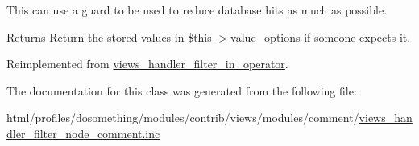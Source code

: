 This can use a guard to be used to reduce database hits as much as possible.

\begin{DoxyReturn}{Returns}
Return the stored values in \$this-\/$>$value\_\-options if someone expects it. 
\end{DoxyReturn}


Reimplemented from \hyperlink{classviews__handler__filter__in__operator_aa5b5df6d90f4359ed28c0c446bdc81a6}{views\_\-handler\_\-filter\_\-in\_\-operator}.

The documentation for this class was generated from the following file:\begin{DoxyCompactItemize}
\item 
html/profiles/dosomething/modules/contrib/views/modules/comment/\hyperlink{views__handler__filter__node__comment_8inc}{views\_\-handler\_\-filter\_\-node\_\-comment.inc}\end{DoxyCompactItemize}
